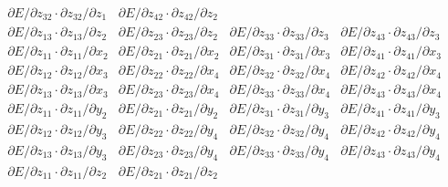 \documentclass{article}
\begin{document}
\begin{equation}
\begin{array}{cccc}
\partial{E} / \partial{z_{32}} \cdot \partial{z_{32}} / \partial{z_1} & 
\partial{E} / \partial{z_{42}} \cdot \partial{z_{42}} / \partial{z_2} \\
\partial{E} / \partial{z_{13}} \cdot \partial{z_{13}} / \partial{z_2} & 
\partial{E} / \partial{z_{23}} \cdot \partial{z_{23}} / \partial{z_2} &
\partial{E} / \partial{z_{33}} \cdot \partial{z_{33}} / \partial{z_3} & 
\partial{E} / \partial{z_{43}} \cdot \partial{z_{43}} / \partial{z_3} \\
\partial{E} / \partial{z_{11}} \cdot \partial{z_{11}} / \partial{x_2} & 
\partial{E} / \partial{z_{21}} \cdot \partial{z_{21}} / \partial{x_2} &
\partial{E} / \partial{z_{31}} \cdot \partial{z_{31}} / \partial{x_3} & 
\partial{E} / \partial{z_{41}} \cdot \partial{z_{41}} / \partial{x_3} \\
\partial{E} / \partial{z_{12}} \cdot \partial{z_{12}} / \partial{x_3} & 
\partial{E} / \partial{z_{22}} \cdot \partial{z_{22}} / \partial{x_4} &
\partial{E} / \partial{z_{32}} \cdot \partial{z_{32}} / \partial{x_4} & 
\partial{E} / \partial{z_{42}} \cdot \partial{z_{42}} / \partial{x_4} \\
\partial{E} / \partial{z_{13}} \cdot \partial{z_{13}} / \partial{x_3} & 
\partial{E} / \partial{z_{23}} \cdot \partial{z_{23}} / \partial{x_4} &
\partial{E} / \partial{z_{33}} \cdot \partial{z_{33}} / \partial{x_4} & 
\partial{E} / \partial{z_{43}} \cdot \partial{z_{43}} / \partial{x_4} \\
\partial{E} / \partial{z_{11}} \cdot \partial{z_{11}} / \partial{y_2} & 
\partial{E} / \partial{z_{21}} \cdot \partial{z_{21}} / \partial{y_2} &
\partial{E} / \partial{z_{31}} \cdot \partial{z_{31}} / \partial{y_3} & 
\partial{E} / \partial{z_{41}} \cdot \partial{z_{41}} / \partial{y_3} \\
\partial{E} / \partial{z_{12}} \cdot \partial{z_{12}} / \partial{y_3} & 
\partial{E} / \partial{z_{22}} \cdot \partial{z_{22}} / \partial{y_4} &
\partial{E} / \partial{z_{32}} \cdot \partial{z_{32}} / \partial{y_4} & 
\partial{E} / \partial{z_{42}} \cdot \partial{z_{42}} / \partial{y_4} \\
\partial{E} / \partial{z_{13}} \cdot \partial{z_{13}} / \partial{y_3} & 
\partial{E} / \partial{z_{23}} \cdot \partial{z_{23}} / \partial{y_4} &
\partial{E} / \partial{z_{33}} \cdot \partial{z_{33}} / \partial{y_4} & 
\partial{E} / \partial{z_{43}} \cdot \partial{z_{43}} / \partial{y_4} \\
\partial{E} / \partial{z_{11}} \cdot \partial{z_{11}} / \partial{z_2} & 
\partial{E} / \partial{z_{21}} \cdot \partial{z_{21}} / \partial{z_2} &

\end{array}
\end{equation}
\end{document}
